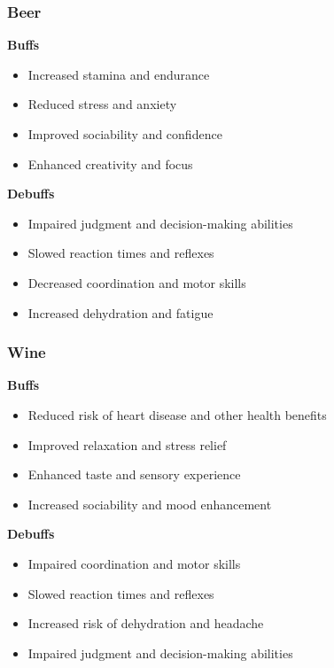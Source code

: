 \documentclass{book}
\begin{document}
\subsubsection{Beer}
    \textbf{Buffs}
        \begin{itemize}
            \item Increased stamina and endurance
            \item Reduced stress and anxiety
            \item Improved sociability and confidence
            \item Enhanced creativity and focus
        \end{itemize}
    \textbf{Debuffs}
        \begin{itemize}
            \item Impaired judgment and decision-making abilities
            \item Slowed reaction times and reflexes
            \item Decreased coordination and motor skills
            \item Increased dehydration and fatigue
        \end{itemize}
\subsubsection{Wine}
    \textbf{Buffs}
        \begin{itemize}
            \item Reduced risk of heart disease and other health benefits
            \item Improved relaxation and stress relief
            \item Enhanced taste and sensory experience
            \item Increased sociability and mood enhancement
        \end{itemize}
    \textbf{Debuffs}
        \begin{itemize}
            \item Impaired coordination and motor skills
            \item Slowed reaction times and reflexes
            \item Increased risk of dehydration and headache
            \item Impaired judgment and decision-making abilities
        \end{itemize}
\end{document}
